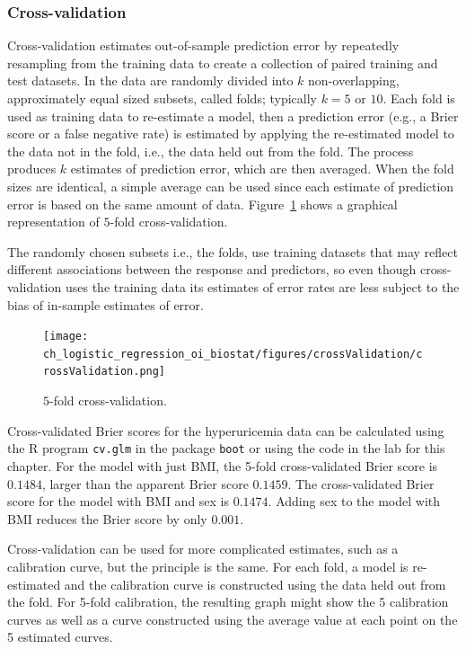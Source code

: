 \subsubsection{Cross-validation}

Cross-validation estimates out-of-sample prediction error by repeatedly resampling from the training data to create a collection of paired training and test datasets. In  the data are randomly divided into $k$ non-overlapping, approximately equal sized subsets, called folds; typically $k = 5 \text{ or } 10$. Each fold is used as training data to re-estimate a model, then a prediction error (e.g., a Brier score or a false negative rate) is estimated by applying the re-estimated model to the data not in the fold, i.e., the data held out from the fold.  The process produces $k$ estimates of prediction error, which are then averaged. When the fold sizes are identical, a simple average can be used since each estimate of prediction error is based on the same amount of data. Figure~\ref{figure:crossValidation} shows a graphical representation of $5$-fold cross-validation.

The randomly chosen subsets i.e., the folds, use training datasets that may reflect different associations between the response and predictors, so even though cross-validation uses the training data its estimates of error rates are less subject to the bias of in-sample estimates of error.

\begin{figure}[h!]
  \centering
  \texttt{[image: ch\_logistic\_regression\_oi\_biostat/figures/crossValidation/crossValidation.png]}
    \caption{$5$-fold cross-validation.}
    \label{figure:crossValidation}
\end{figure}

Cross-validated Brier scores for the hyperuricemia data can be calculated using the \textsf{R} program \texttt{cv.glm} in the package \texttt{boot} or using the code in the lab for this chapter. For the model with just BMI, the 5-fold cross-validated Brier score is $0.1484$, larger than the apparent Brier score $0.1459$.  The cross-validated Brier score for the model with BMI and sex is $0.1474$.  Adding sex to the model with BMI reduces the Brier score by only $0.001$.  

Cross-validation can be used for more complicated estimates, such as a calibration curve, but the principle is the same.  For each fold, a model is re-estimated and the calibration curve is constructed using the data held out from the fold.  For 5-fold calibration, the resulting graph might show the 5 calibration curves as well as a curve constructed using the average value at each point on the 5 estimated curves. 

